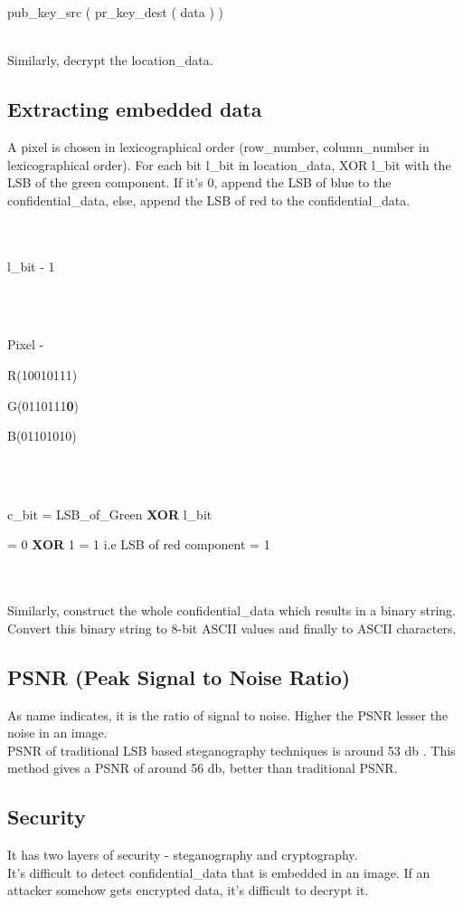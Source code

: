 \documentclass[conference]{IEEEtran}
\begin{document}
\centerline{ pub\_key\_src ( pr\_key\_dest ( data ) ) }
\leavevmode \\

Similarly, decrypt the location\_data. \\
\subsection{Extracting embedded data}
A pixel is chosen in lexicographical order (row\_number, column\_number in lexicographical order).
For each bit l\_bit in location\_data, XOR l\_bit with the LSB of the green component.
If it's 0, append the LSB of blue to the confidential\_data, else, append the LSB of red to the confidential\_data.\\
\\ \\
\centerline{l\_bit - 1}
\leavevmode \\ \\
\centerline{Pixel - }
\centerline{R(10010111)}
\centerline{G(0110111\textbf{0})}
\centerline{B(01101010)}
\leavevmode \\ \\
\centerline{c\_bit = LSB\_of\_Green \textbf{XOR} l\_bit}
\centerline{ = 0 \textbf{XOR} 1 = 1 i.e LSB of red component = 1 }
\leavevmode \\ \\

Similarly, construct the whole confidential\_data which results in a binary string.
Convert this binary string to 8-bit ASCII values and finally to ASCII characters.\\
\subsection{PSNR (Peak Signal to Noise Ratio)}
As name indicates, it is the ratio of signal to noise.
Higher the PSNR lesser the noise in an image.\\

PSNR of traditional LSB based steganography techniques is around 53 db \cite{b1}.
This method gives a PSNR of around 56 db, better than traditional PSNR.\\  
\subsection{Security}
It has two layers of security - steganography and cryptography.\\

It's difficult to detect confidential\_data that is embedded in an image.
If an attacker somehow gets encrypted data, it's difficult to decrypt it.\\
\end{document}
